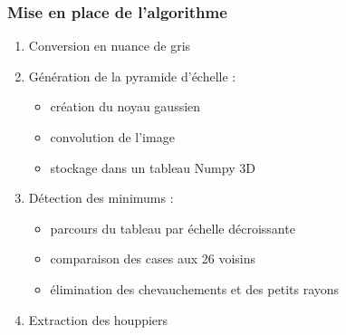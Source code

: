 \documentclass{beamer}
\begin{document}
	\begin{frame}
	\frametitle{Mise en place de l'algorithme}
	\begin{enumerate}
		\item Conversion en nuance de gris
		\item Génération de la pyramide d'échelle : 
		\begin{itemize}
			\item création du noyau gaussien
			\item convolution de l'image 
			\item stockage dans un tableau Numpy 3D
		\end{itemize}
		\item Détection des minimums : 
		\begin{itemize}
			\item parcours du tableau par échelle décroissante
			\item comparaison des cases aux 26 voisins
			\item élimination des chevauchements et des petits rayons 
		\end{itemize}
		\item Extraction des houppiers
	\end{enumerate}	
\end{frame}
\end{document}

